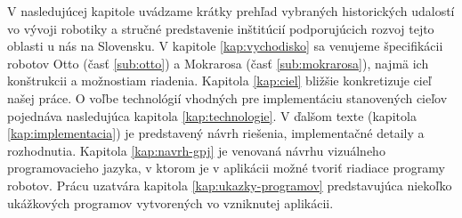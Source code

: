 V nasledujúcej kapitole uvádzame krátky prehľad vybraných historických udalostí vo vývoji robotiky a stručné predstavenie inštitúcií podporujúcich rozvoj tejto oblasti u nás na Slovensku. V kapitole \ref{kap:vychodisko} sa venujeme špecifikácii robotov Otto (časť \ref{sub:otto}) a Mokrarosa (časť \ref{sub:mokrarosa}), najmä ich konštrukcii a možnostiam riadenia. Kapitola \ref{kap:ciel} bližšie konkretizuje cieľ našej práce. O voľbe technológií vhodných pre implementáciu stanovených cieľov pojednáva nasledujúca kapitola \ref{kap:technologie}. V ďalšom texte (kapitola \ref{kap:implementacia}) je predstavený návrh riešenia, implementačné detaily a rozhodnutia. Kapitola \ref{kap:navrh-gpj} je venovaná návrhu vizuálneho programovacieho jazyka, v ktorom je v aplikácii možné tvoriť riadiace programy robotov. Prácu uzatvára kapitola \ref{kap:ukazky-programov} predstavujúca niekoľko ukážkových programov vytvorených vo vzniknutej aplikácii.
